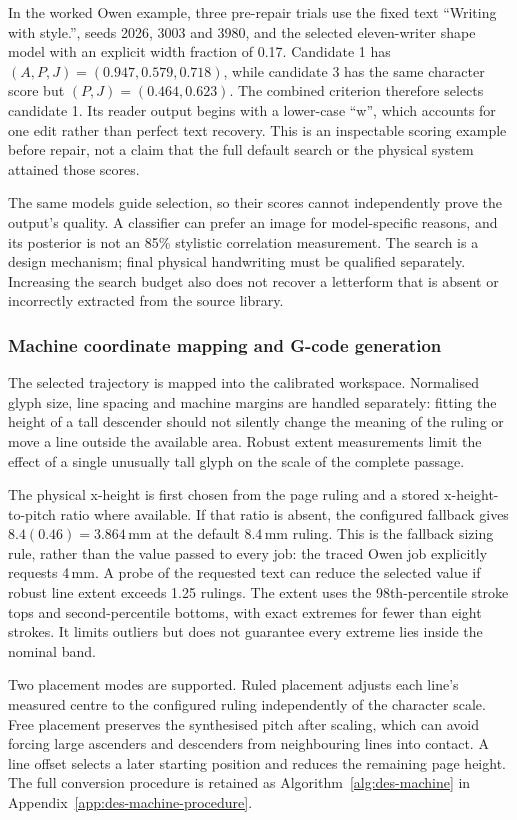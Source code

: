In the worked Owen example, three pre-repair trials use the fixed text ``Writing with style.'', seeds 2026, 3003 and 3980, and the selected eleven-writer shape model with an explicit width fraction of 0.17. Candidate 1 has $(A,P,J)=(0.947,0.579,0.718)$, while candidate 3 has the same character score but $(P,J)=(0.464,0.623)$. The combined criterion therefore selects candidate 1. Its reader output begins with a lower-case ``w'', which accounts for one edit rather than perfect text recovery. This is an inspectable scoring example before repair, not a claim that the full default search or the physical system attained those scores.

The same models guide selection, so their scores cannot independently prove the output's quality. A classifier can prefer an image for model-specific reasons, and its posterior is not an 85\% stylistic correlation measurement. The search is a design mechanism; final physical handwriting must be qualified separately. Increasing the search budget also does not recover a letterform that is absent or incorrectly extracted from the source library.

\subsubsection{Machine coordinate mapping and G-code generation}
\label{sec:des-gcode}
The selected trajectory is mapped into the calibrated workspace. Normalised glyph size, line spacing and machine margins are handled separately: fitting the height of a tall descender should not silently change the meaning of the ruling or move a line outside the available area. Robust extent measurements limit the effect of a single unusually tall glyph on the scale of the complete passage.

The physical x-height is first chosen from the page ruling and a stored x-height-to-pitch ratio where available. If that ratio is absent, the configured fallback gives $8.4(0.46)=3.864$\,mm at the default 8.4\,mm ruling. This is the fallback sizing rule, rather than the value passed to every job: the traced Owen job explicitly requests 4\,mm. A probe of the requested text can reduce the selected value if robust line extent exceeds 1.25 rulings. The extent uses the 98th-percentile stroke tops and second-percentile bottoms, with exact extremes for fewer than eight strokes. It limits outliers but does not guarantee every extreme lies inside the nominal band.

Two placement modes are supported. Ruled placement adjusts each line's measured centre to the configured ruling independently of the character scale. Free placement preserves the synthesised pitch after scaling, which can avoid forcing large ascenders and descenders from neighbouring lines into contact. A line offset selects a later starting position and reduces the remaining page height. The full conversion procedure is retained as Algorithm~\ref{alg:des-machine} in Appendix~\ref{app:des-machine-procedure}.

